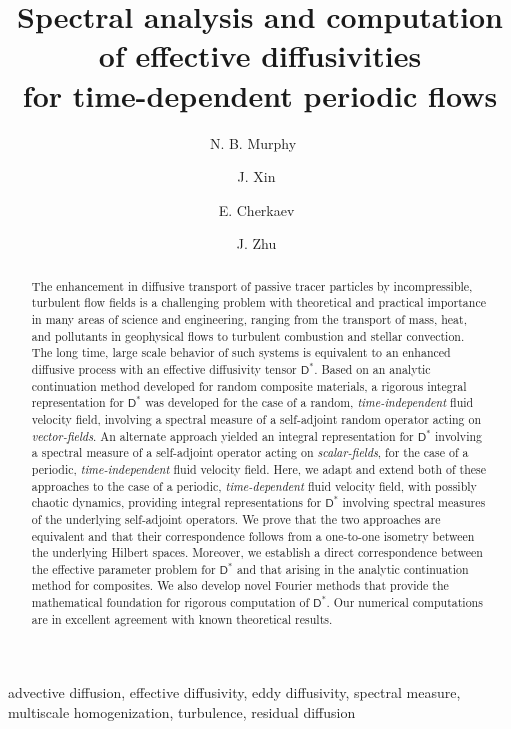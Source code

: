 \documentclass[leqno,onefignum,onetabnum]{siamltex1213}
\title{Spectral analysis and computation of effective diffusivities\\
  for time-dependent periodic flows  
      }
\author{
N. B. Murphy\footnotemark[1]\ \footnotemark[3]\ \footnotemark[4]
\and J. Xin\footnotemark[1]\ \footnotemark[3]
\and E. Cherkaev\footnotemark[2]\ \footnotemark[4]
\and J. Zhu\footnotemark[2]\ \footnotemark[4]%
}
\newcommand{\Dm}{\mathsf{D}}
\begin{document}
\maketitle
{}%

\begin{abstract}
The enhancement in diffusive transport of passive tracer particles by
incompressible, turbulent flow fields is a challenging problem with
theoretical and practical importance in many areas of science and
engineering, ranging from the transport of mass, heat, and pollutants
in geophysical flows to turbulent combustion and stellar
convection. The long time, large scale behavior of such systems is
equivalent to an enhanced diffusive process with an effective
diffusivity tensor $\Dm^*$. Based on an analytic continuation method
developed for random composite materials, a rigorous integral
representation for $\Dm^*$ was developed for the case of a random,
\emph{time-independent} fluid velocity field, involving a spectral
measure of a self-adjoint random operator acting on
\emph{vector-fields}. An alternate approach yielded an integral
representation for $\Dm^*$ involving a spectral measure of a
self-adjoint operator acting on \emph{scalar-fields}, for the case of
a periodic, \emph{time-independent} fluid velocity field. Here, we
adapt and extend both of these approaches to the case of a periodic,
\emph{time-dependent} fluid velocity field, with possibly chaotic
dynamics, providing integral representations for $\Dm^*$ involving
spectral measures of the underlying self-adjoint operators. We prove
that the two approaches are equivalent and that their correspondence
follows from a one-to-one isometry between the underlying Hilbert
spaces. Moreover, we establish a direct correspondence between the
effective parameter problem for $\Dm^*$ and that arising in the
analytic continuation method for composites. We also develop novel
Fourier methods that provide the mathematical foundation for rigorous
computation of $\Dm^*$. Our numerical computations are in excellent
agreement with known theoretical results.           
\end{abstract}

\begin{keywords}
advective diffusion, effective diffusivity, eddy diffusivity, spectral
measure, multiscale homogenization, turbulence, residual diffusion
\end{keywords}
\end{document}
